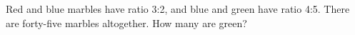 Red and blue marbles have ratio 3:2, and blue and green have ratio 4:5. There are forty-five marbles altogether. How many are green?
